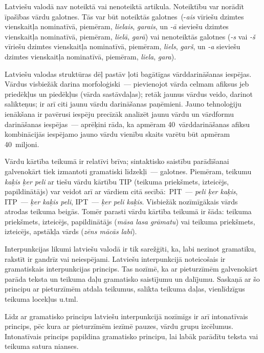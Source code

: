 \begin{multicols}{2}
Latviešu valodā nav noteiktā vai nenoteiktā artikula.
Noteiktību var norādīt īpašības vārdu galotnes.
Tās var būt noteiktās galotnes~(-\textit{ais} vīriešu dzimtes vienskaitļa nominatīvā, piemēram, \textit{lielais}, \textit{garais}, un \textit{-ā} sieviešu dzimtes vienskaitļa nominatīvā, piemēram, \textit{lielā}, \textit{garā}) vai nenoteiktās galotnes (\textit{-s} vai \textit{-š} vīriešu dzimtes vienskaitļa nominatīvā, piemēram, \textit{liels}, \textit{garš}, un \textit{-a} sieviešu dzimtes vienskaitļa nominatīvā, piemēram, \textit{liela}, \textit{gara}).

Latviešu valodas struktūras dēļ pastāv ļoti bagātīgas vārddarināšanas iespējas.
Vārdus visbiežāk darina morfoloģiski~--- pievienojot vārda celmam afiksus jeb priedēkļus un piedēkļus (vārda sastāvdaļas); retāk jaunus vārdus veido, darinot salikteņus; ir arī citi jaunu vārdu darināšanas paņēmieni.
Jauno tehnoloģiju ienākšana ir pavērusi iespēju precīzāk analizēt jaunu vārdu un vārdformu darināšanas iespējas~--- aprēķini rāda, ka apmēram 40~vārddarināšanas afiksu kombinācijās iespējamo jauno vārdu vienību skaits varētu būt apmēram 40~miljoni.


Vārdu kārtība teikumā ir relatīvi brīva; sintaktisko saistību parādīšanai galvenokārt tiek izmantoti gramatiski līdzekļi~--- galotnes.
Piemēram, teikumu \textit{kaķis ķer peli} ar tiešu vārdu kārtību TIP (teikuma priekšmets, izteicējs, papildinātājs) var veidot arī ar vārdiem citā secībā:~PIT~--- \textit{peli ķer kaķis}, ITP~--- \textit{ķer kaķis peli}, IPT~--- \textit{ķer peli kaķis}.
Visbiežāk nozīmīgākais vārds atrodas teikuma beigās.
Tomēr parasti vārdu kārtība teikumā ir šāda: teikuma priekšmets, izteicējs, papildinātājs (\textit{māsa lasa grāmatu}) vai teikuma priekšmets, izteicējs, apstākļa vārds (\textit{zēns mācās labi}).

Interpunkcijas likumi latviešu valodā ir tik sarežģīti, ka, labi nezinot gramatiku, rakstīt ir gandrīz vai neiespējami.
Latviešu interpunkcijā noteicošais ir gramatiskais interpunkcijas princips.
Tas nozīmē, ka ar pieturzīmēm galvenokārt parāda teksta un teikuma daļu gramatisko saistījumu un dalījumu.
Saskaņā ar šo principu ar pieturzīmēm atdala teikumus, salikta teikuma daļas, vienlīdzīgus teikuma locekļus u.tml.

Līdz ar gramatisko principu latviešu interpunkcijā nozīmīgs ir arī intonatīvais princips, pēc kura ar pieturzīmēm iezīmē pauzes, vārdu grupu izcēlumus.
Intonatīvais princips papildina gramatisko principu, lai labāk parādītu teksta vai teikuma satura nianses.


\end{multicols}
